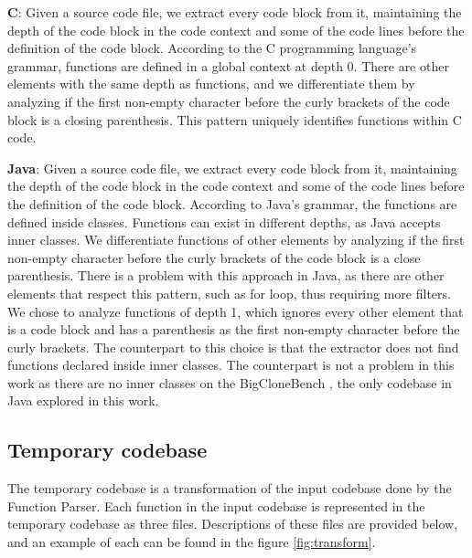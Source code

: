 \begin{itemize}
	\begin{item}
		\textbf{C}: Given a source code file, we extract every code block from it, maintaining the depth 
		of the code block in the code context and some of the code lines before the definition of the 
		code block. According to the C programming language’s grammar, functions are defined in a 
		global context at depth 0. There are other elements with the same depth as functions, and we 
		differentiate them by analyzing if the first non-empty character before the curly brackets of 
		the code block is a closing parenthesis. This pattern uniquely identifies functions 
		within C code.

	\end{item}
	\begin{item}
		\textbf{Java}:  Given a source code file, we extract every code block from it, maintaining the 
		depth of the code block in the code context and some of the code lines before the definition 
		of the code block. According to Java’s grammar, the functions are defined inside classes. 
		Functions can exist in different depths, as Java accepts inner classes. We differentiate 
		functions of other elements by analyzing if the first non-empty character before the curly 
		brackets of the code block is a close parenthesis. There is a problem with this approach in 
		Java, as there are other elements that respect this pattern, such as for loop, thus requiring 
		more filters. We chose to analyze functions of depth 1, which ignores every other element that 
		is a code block and has a parenthesis as the first non-empty character before the curly brackets. 
		The counterpart to this choice is that the extractor does not find functions declared inside 
		inner classes. The counterpart is not a problem in this work as there are no inner classes 
		on the BigCloneBench \citep{bigclonebench}, the only codebase in Java explored in this work.

		
	\end{item}
\end{itemize}

\subsection{Temporary codebase}

The temporary codebase is a transformation of the input codebase done by the Function Parser. 
Each function in the input codebase is represented in the temporary codebase as three files.
Descriptions of these files are provided below, and an example of each can be found in 
the figure \ref{fig:transform}.


